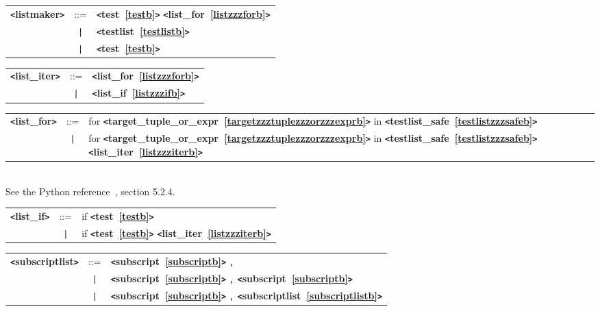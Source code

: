 \label{listmakerb}
\begin{tabular}{lcl}
{\bf \verb+<+listmaker\verb+>+} & ::=  & {\bf \verb+<+test~\ref{testb}\verb+>+}  {\bf \verb+<+list\_for~\ref{listzzzforb}\verb+>+}  \\
 & \verb+|+  & {\bf \verb+<+testlist~\ref{testlistb}\verb+>+}  \\
 & \verb+|+  & {\bf \verb+<+test~\ref{testb}\verb+>+}  \\
\end{tabular}

\label{listzzziterb}
\begin{tabular}{lcl}
{\bf \verb+<+list\_iter\verb+>+} & ::=  & {\bf \verb+<+list\_for~\ref{listzzzforb}\verb+>+}  \\
 & \verb+|+  & {\bf \verb+<+list\_if~\ref{listzzzifb}\verb+>+}  \\
\end{tabular}

\label{listzzzforb}

\settowidth{\tw}{list\_for  ::=  }
\addtolength{\tw}{2\arraycolsep}

\setlength{\len}{\textwidth}
\addtolength{\len}{-1\tw}
\begin{tabular}{lcp{\len}}
{\bf \verb+<+list\_for\verb+>+} & ::=  & for {\bf \verb+<+target\_tuple\_or\_expr~\ref{targetzzztuplezzzorzzzexprb}\verb+>+}  in {\bf \verb+<+testlist\_safe~\ref{testlistzzzsafeb}\verb+>+}  \\
 & \verb+|+  & for {\bf \verb+<+target\_tuple\_or\_expr~\ref{targetzzztuplezzzorzzzexprb}\verb+>+}  in {\bf \verb+<+testlist\_safe~\ref{testlistzzzsafeb}\verb+>+}  {\bf \verb+<+list\_iter~\ref{listzzziterb}\verb+>+}  \\
\end{tabular} \\

See the Python reference~\cite{pythonlang}, section 5.2.4.

\label{listzzzifb}
\begin{tabular}{lcl}
{\bf \verb+<+list\_if\verb+>+} & ::=  & if {\bf \verb+<+test~\ref{testb}\verb+>+}  \\
 & \verb+|+  & if {\bf \verb+<+test~\ref{testb}\verb+>+}  {\bf \verb+<+list\_iter~\ref{listzzziterb}\verb+>+}  \\
\end{tabular}

\label{subscriptlistb}
\begin{tabular}{lcl}
{\bf \verb+<+subscriptlist\verb+>+} & ::=  & {\bf \verb+<+subscript~\ref{subscriptb}\verb+>+}  \verb|,| \\
 & \verb+|+  & {\bf \verb+<+subscript~\ref{subscriptb}\verb+>+}  \verb|,| {\bf \verb+<+subscript~\ref{subscriptb}\verb+>+}  \\
 & \verb+|+  & {\bf \verb+<+subscript~\ref{subscriptb}\verb+>+}  \verb|,| {\bf \verb+<+subscriptlist~\ref{subscriptlistb}\verb+>+}  \\
\end{tabular}


